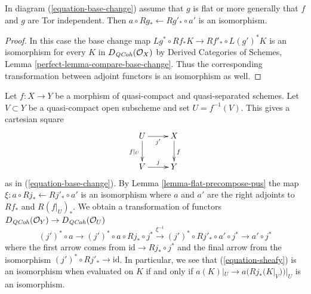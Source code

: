 \begin{lemma}
\label{lemma-flat-precompose-pus}
In diagram (\ref{equation-base-change}) assume that $g$ is flat or
more generally that $f$ and $g$ are Tor independent. Then
$a \circ Rg_* \leftarrow Rg'_* \circ a'$ is an isomorphism.
\end{lemma}

\begin{proof}
In this case the base change map
$Lg^* \circ Rf_* K \longrightarrow Rf'_* \circ L(g')^*K$
is an isomorphism for every $K$ in $D_{\mathit{QCoh}}(\mathcal{O}_X)$ by
Derived Categories of Schemes, Lemma \ref{perfect-lemma-compare-base-change}.
Thus the corresponding transformation between adjoint functors
is an isomorphism as well.
\end{proof}

\noindent
Let $f : X \to Y$ be a morphism of quasi-compact and quasi-separated
schemes. Let $V \subset Y$ be a quasi-compact open subscheme and set
$U = f^{-1}(V)$. This gives a cartesian square
$$
\xymatrix{
U \ar[r]_{j'} \ar[d]_{f|_U} & X \ar[d]^f \\
V \ar[r]^j & Y
}
$$
as in (\ref{equation-base-change}). By Lemma \ref{lemma-flat-precompose-pus}
the map $\xi : a \circ Rj_* \leftarrow Rj'_* \circ a'$ is an isomorphism
where $a$ and $a'$ are the right adjoints to
$Rf_*$ and $R(f|_U)_*$. We obtain a transformation
of functors $D_{\mathit{QCoh}}(\mathcal{O}_Y) \to D_{\mathit{QCoh}}(\mathcal{O}_U)$
\begin{equation}
\label{equation-sheafy}
(j')^* \circ a \to
(j')^* \circ a \circ Rj_* \circ j^* \xrightarrow{\xi^{-1}}
(j')^* \circ Rj'_* \circ a' \circ j^* \to a' \circ j^*
\end{equation}
where the first arrow comes from $\text{id} \to Rj_* \circ j^*$
and the final arrow from the isomorphism $(j')^* \circ Rj'_* \to \text{id}$.
In particular, we see that (\ref{equation-sheafy}) is an isomorphism
when evaluated on $K$ if and only if $a(K)|_U \to a(Rj_*(K|_V))|_U$
is an isomorphism.


